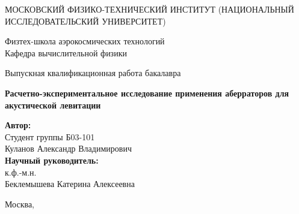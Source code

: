 \begin{center}
    \large МОСКОВСКИЙ ФИЗИКО-ТЕХНИЧЕСКИЙ ИНСТИТУТ (НАЦИОНАЛЬНЫЙ ИССЛЕДОВАТЕЛЬСКИЙ УНИВЕРСИТЕТ)
    \vspace{1cm}

    Физтех-школа аэрокосмических технологий \\

    Кафедра вычислительной физики \\

    \vspace{3em}

    Выпускная квалификационная работа бакалавра
\end{center}

\begin{center}
    \vspace{\fill}
    \LARGE\textbf{{Расчетно-экспериментальное исследование применения аберраторов для акустической левитации}}

    \vspace{\fill}
\end{center}


\begin{flushright}
    \textbf{Автор:} \\
    Студент группы Б03-101\\
    Куланов Александр Владимирович \\
    \vspace{2em}
    \textbf{Научный руководитель:} \\
    к.ф.-м.н.\\
    Беклемышева Катерина Алексеевна \\
    \vspace{2em}
\end{flushright}

\vspace{\fill}

\begin{center}
    Москва, \the\year{}
\end{center}

\thispagestyle{empty}

\newpage
\setcounter{page}{2}

